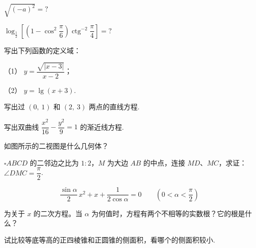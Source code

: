\begin{question}
$\sqrt{(-a)^2}=?$

\end{question}
\begin{question}
$\log_{\frac{1}{2}}\left[\left(1-\cos^2\dfrac{\pi}{6}\right)\operatorname{ctg}^{-2}\dfrac{\pi}{4}\right]=?$

\end{question}
\begin{question}
写出下列函数的定义域：

（1） $y=\dfrac{\sqrt{|x-3|}}{x-2}$；

（2） $y=\lg(x+3)$.

\end{question}
\begin{question}
写出过 $(0,\ 1)$ 和 $(2,\ 3)$ 两点的直线方程.

\end{question}
\begin{question}
写出双曲线 $\dfrac{x^2}{16}-\dfrac{y^2}{9}=1$ 的渐近线方程.

\Needspace{0.4\textheight}
\end{question}
\begin{question}
如图所示的二视图是什么几何体？
\nopagebreak[4]
\begin{center}\end{center}
\nopagebreak[4]
\Needspace{0.4\textheight}
\end{question}
\begin{question}
$\square ABCD$ 的二邻边之比为 $1:2$，$M$ 为大边 $AB$ 的中点，连接 $MD$、$MC$，求证：$\angle DMC=\dfrac{\pi}{2}$.
\nopagebreak[4]
\begin{center}\end{center}
\nopagebreak[4]
\end{question}
\begin{question}

\nopagebreak[4]
\[
\frac{\sin\alpha}{2}\,x^2+x+\frac{1}{2\cos\alpha}=0
\qquad\left(0<\alpha<\frac{\pi}{2}\right)
\]

为关于 $x$ 的二次方程。当 $\alpha$ 为何值时，方程有两个不相等的实数根？它的根是什么？

\end{question}
\begin{question}
试比较等底等高的正四棱锥和正圆锥的侧面积，看哪个的侧面积较小.

\Needspace{0.4\textheight}
\end{question}
